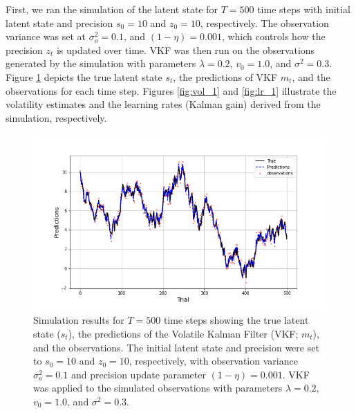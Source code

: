 \documentclass[12pt]{article}
\theoremstyle{definition}
\begin{document}
First, we ran the simulation of the latent state for $T=500$ time steps with initial latent state and precision $s_0=10$ and $z_0=10$, respectively. 
The observation variance was set at $\sigma_o^2=0.1$, and $(1-\eta) = 0.001$, which controls how the precision $z_t$ is updated over time.
VKF was then run on the observations generated by the simulation with parameters $\lambda = 0.2$, $v_0=1.0$, and $\sigma^2 =0.3$.
Figure \ref{fig:walk_1} depicts the true latent state $s_t$, the predictions of VKF $m_t$, and the observations for each time step. 
Figures \ref{fig:vol_1} and \ref{fig:lr_1} illustrate the volatility estimates and the learning rates (Kalman gain) derived from the simulation, respectively.

\begin{figure}[H]
    \centering
    \includegraphics[scale=0.5]{../Figures/exp1_walk.png}
    \caption{Simulation results for $T = 500$ time steps showing the true latent state ($s_t$), the predictions of the Volatile Kalman Filter (VKF; $m_t$), and the observations. The initial latent state and precision were set to $s_0 = 10$ and $z_0 = 10$, respectively, with observation variance $\sigma_o^2 = 0.1$ and precision update parameter $(1-\eta) = 0.001$. VKF was applied to the simulated observations with parameters $\lambda = 0.2$, $v_0 = 1.0$, and $\sigma^2 = 0.3$.
    }
    \label{fig:walk_1}
\end{figure}
\end{document}
